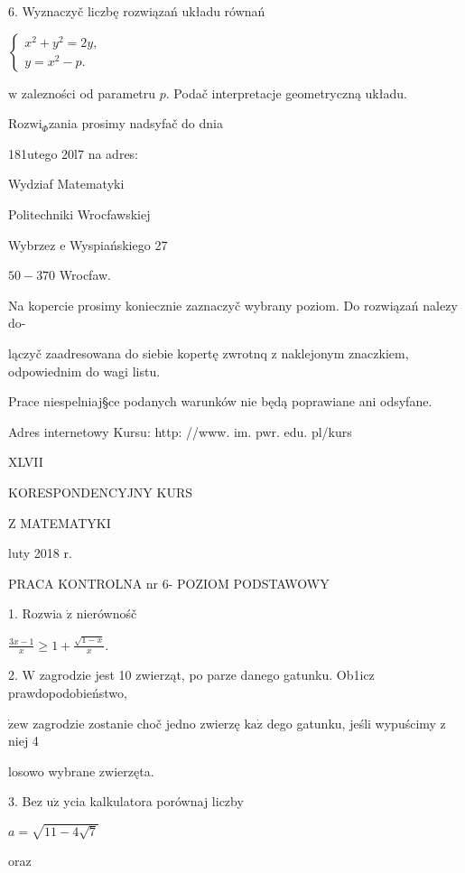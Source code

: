 \documentclass[a4paper,12pt]{article}
\begin{document}
6. Wyznaczyč liczbę rozwiązań układu równań

$\left\{\begin{array}{l}
x^{2}+y^{2}=2y,\\
y=x^{2}-p.
\end{array}\right.$

$\mathrm{w}$ zalezności od parametru $p$. Podač interpretacje geometryczną układu.

$\mathrm{R}\mathrm{o}\mathrm{z}\mathrm{w}\mathrm{i}_{\Phi}$zania prosimy nadsyfač do dnia

181utego 20l7 na adres:

Wydziaf Matematyki

Politechniki Wrocfawskiej

Wybrzez $\mathrm{e}$ Wyspiańskiego 27

$50-370$ Wrocfaw.

Na kopercie prosimy koniecznie zaznaczyč wybrany poziom. Do rozwiązań nalez$\mathrm{y}$ do-

lączyč zaadresowana do siebie kopertę zwrotnq $\mathrm{z}$ naklejonym znaczkiem, odpowiednim do wagi listu.

Prace niespelniaj\S ce podanych warunków nie będą poprawiane ani odsyfane.

Adres internetowy Kursu: http: //www. im. pwr. edu. pl/kurs







XLVII

KORESPONDENCYJNY KURS

Z MATEMATYKI

luty 2018 r.

PRACA KONTROLNA nr 6- POZIOM PODSTAWOWY

1. Rozwia $\dot{\mathrm{z}}$ nierównośč

$\displaystyle \frac{3x-1}{x}\geq 1+\frac{\sqrt{1-x}}{x}.$

2. $\mathrm{W}$ zagrodzie jest 10 zwierząt, po parze danego gatunku. Ob1icz prawdopodobieństwo,

$\dot{\mathrm{z}}\mathrm{e}\mathrm{w}$ zagrodzie zostanie choč jedno zwierzę $\mathrm{k}\mathrm{a}\dot{\mathrm{z}}$ dego gatunku, jeśli wypuścimy $\mathrm{z}$ niej 4

losowo wybrane zwierzęta.

3. Bez $\mathrm{u}\dot{\mathrm{z}}$ ycia kalkulatora porównaj liczby

$a=\sqrt{11-4\sqrt{7}}$

oraz
\end{document}
